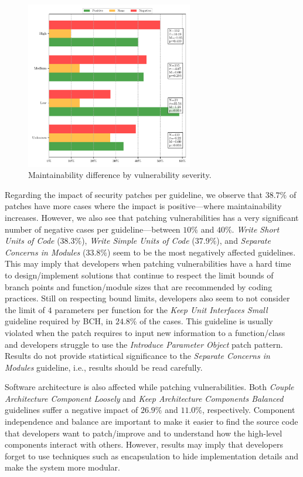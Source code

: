\documentclass[smallextended]{svjour3}       %
\begin{document}
 \begin{figure}[htp]
  	\centering 	 	\includegraphics[width=0.65\textwidth]{figures/main_per_severity.pdf}
  	\caption{Maintainability difference by vulnerability severity.}
 	\label{fig:severity}
 \end{figure}

Regarding the impact of security patches per guideline, we 
observe that $38.7\%$ of patches have more cases where the impact is 
positive---where maintainability increases. However, we also 
see that patching vulnerabilities has a very significant number of 
negative cases per guideline---between $10\%$ and $40\%$. 
\emph{Write Short Units of Code} ($38.3\%$), \emph{Write Simple 
Units of Code} ($37.9\%$), and \emph{Separate Concerns in Modules} 
($33.8\%$) seem to be the most negatively affected guidelines. This 
may imply that developers when patching vulnerabilities have a hard 
time to design/implement solutions that continue to respect the 
limit bounds of branch points and function/module sizes that are 
recommended by coding practices. Still on respecting bound limits, 
developers also seem to not consider the limit of $4$ parameters per 
function for the \emph{Keep Unit Interfaces Small} guideline 
required by BCH, in $24.8\%$ of the cases. This guideline is usually
violated when the patch requires to input new information to a 
function/class and developers struggle to use the \emph{Introduce 
Parameter Object} patch pattern. Results do not provide statistical 
significance to the \emph{Separate Concerns in Modules} guideline, 
i.e., results should be read carefully. 

Software architecture is also affected while patching 
vulnerabilities. Both \emph{Couple Architecture Component Loosely} 
and \emph{Keep Architecture Components Balanced} guidelines suffer a 
negative impact of $26.9\%$ and $11.0\%$, respectively. Component 
independence and balance are important to make it easier to find the 
source code that developers want to patch/improve and to understand 
how the high-level components interact with others. However, results 
may imply that developers forget to use techniques such as 
encapsulation to hide implementation details and make the system 
more modular.
\end{document}
